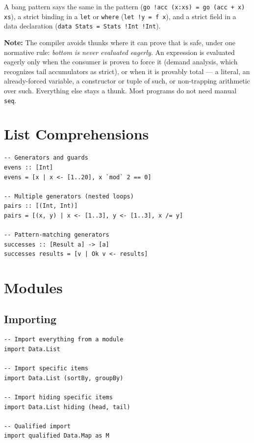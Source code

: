 \documentclass[11pt,a4paper]{article}
\newenvironment{note}{%
  \def\FrameCommand{\fboxsep=3mm \colorbox{notebg}}%
  \MakeFramed{\advance\hsize-\width \FrameRestore}%
  \noindent\textbf{Note:} }%
  {\endMakeFramed}
\begin{document}
A bang pattern says the same in the pattern (\texttt{go !acc (x:xs) = go
(acc + x) xs}), a strict binding in a \texttt{let} or \texttt{where}
(\texttt{let !y = f x}), and a strict field in a data declaration
(\texttt{data Stats = Stats !Int !Int}).

\begin{note}
The compiler avoids thunks where it can prove that is safe, under one
normative rule: \emph{bottom is never evaluated eagerly}.  An expression
is evaluated eagerly only when the consumer is proven to force it
(demand analysis, which recognizes tail accumulators as strict), or when
it is provably total --- a literal, an already-forced variable, a
constructor or tuple of such, or non-trapping arithmetic over such.
Everything else stays a thunk.  Most programs do not need manual
\texttt{seq}.
\end{note}

\section{List Comprehensions}

\begin{lstlisting}
-- Generators and guards
evens :: [Int]
evens = [x | x <- [1..20], x `mod` 2 == 0]

-- Multiple generators (nested loops)
pairs :: [(Int, Int)]
pairs = [(x, y) | x <- [1..3], y <- [1..3], x /= y]

-- Pattern-matching generators
successes :: [Result a] -> [a]
successes results = [v | Ok v <- results]
\end{lstlisting}

\section{Modules}

\subsection{Importing}

\begin{lstlisting}
-- Import everything from a module
import Data.List

-- Import specific items
import Data.List (sortBy, groupBy)

-- Import hiding specific items
import Data.List hiding (head, tail)

-- Qualified import
import qualified Data.Map as M
\end{lstlisting}
\end{document}
